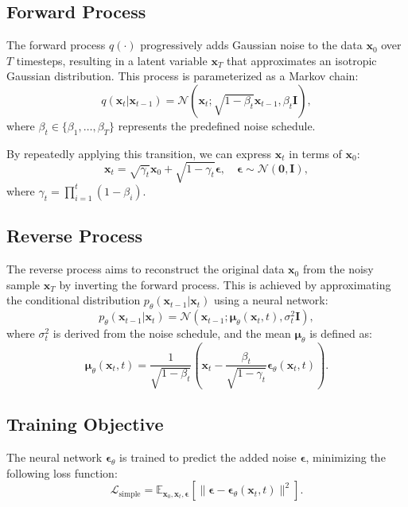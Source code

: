 \documentclass[12pt,a4paper]{article}
\begin{document}
\subsection{Forward Process}
The forward process $q(\cdot)$ progressively adds Gaussian noise to the data
$\mathbf{x}_0$ over $T$ timesteps, resulting in a latent variable $\mathbf{x}_T$
that approximates an isotropic Gaussian distribution. This process is
parameterized as a Markov chain:
\begin{equation}
q(\mathbf{x}_t | \mathbf{x}_{t-1}) = \mathcal{N}(\mathbf{x}_t; \sqrt{1 - \beta_t}\mathbf{x}_{t-1}, \beta_t \mathbf{I}),
\end{equation}
where $\beta_t \in \{\beta_1, \dots, \beta_T\}$ represents the predefined noise
schedule.

By repeatedly applying this transition, we can express $\mathbf{x}_t$ in terms
of $\mathbf{x}_0$:
\begin{equation}
\mathbf{x}_t = \sqrt{\gamma_t}\mathbf{x}_0 + \sqrt{1 - \gamma_t}\boldsymbol{\epsilon}, \quad \boldsymbol{\epsilon} \sim \mathcal{N}(\mathbf{0}, \mathbf{I}),
\end{equation}
where $\gamma_t = \prod_{i=1}^t (1 - \beta_i)$.

\subsection{Reverse Process}
The reverse process aims to reconstruct the original data $\mathbf{x}_0$ from
the noisy sample $\mathbf{x}_T$ by inverting the forward process. This is
achieved by approximating the conditional distribution
$p_\theta(\mathbf{x}_{t-1} | \mathbf{x}_t)$ using a neural network:
\begin{equation}
p_\theta(\mathbf{x}_{t-1} | \mathbf{x}_t) = \mathcal{N}(\mathbf{x}_{t-1}; \boldsymbol{\mu}_\theta(\mathbf{x}_t, t), \sigma_t^2 \mathbf{I}),
\end{equation}
where $\sigma_t^2$ is derived from the noise schedule, and the mean
$\boldsymbol{\mu}_\theta$ is defined as:
\begin{equation}
\boldsymbol{\mu}_\theta(\mathbf{x}_t, t) = \frac{1}{\sqrt{1 - \beta_t}} \left( \mathbf{x}_t - \frac{\beta_t}{\sqrt{1 - \gamma_t}} \boldsymbol{\epsilon}_\theta(\mathbf{x}_t, t) \right).
\end{equation}

\subsection{Training Objective}
The neural network $\boldsymbol{\epsilon}_\theta$ is trained to predict the
added noise $\boldsymbol{\epsilon}$, minimizing the following loss function:
\begin{equation}
\mathcal{L}_{\text{simple}} = \mathbb{E}_{\mathbf{x}_0, \mathbf{x}_t, \boldsymbol{\epsilon}} \left[ \| \boldsymbol{\epsilon} - \boldsymbol{\epsilon}_\theta(\mathbf{x}_t, t) \|^2 \right].
\end{equation}
\end{document}
